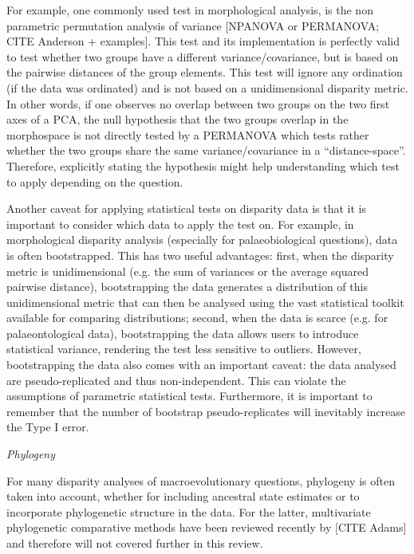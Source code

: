 \documentclass[12pt,letterpaper]{article}
\renewcommand{\subsection}[1]{%
\bigskip
\begin{center}
\begin{large}
\normalfont\itshape #1
\end{large}
\end{center}}
\begin{document}
For example, one commonly used test in morphological analysis, is the non parametric permutation analysis of variance [NPANOVA or PERMANOVA; CITE Anderson + examples].
This test and its implementation is perfectly valid to test whether two groups have a different variance/covariance, but is based on the pairwise distances of the group elements.
This test will ignore any ordination (if the data was ordinated) and is not based on a unidimensional disparity metric.
In other words, if one observes no overlap between two groups on the two first axes of a PCA, the null hypothesis that the two groups overlap in the morphospace is not directly tested by a PERMANOVA which tests rather whether the two groups share the same variance/covariance in a ``distance-space''.
Therefore, explicitly stating the hypothesis might help understanding which test to apply depending on the question.

Another caveat for applying statistical tests on disparity data is that it is important to consider which data to apply the test on.
For example, in morphological disparity analysis (especially for palaeobiological questions), data is often bootstrapped.
This has two useful advantages: first, when the disparity metric is unidimensional (e.g. the sum of variances or the average squared pairwise distance), bootstrapping the data generates a distribution of this unidimensional metric that can then be analysed using the vast statistical toolkit available for comparing distributions; second, when the data is scarce (e.g. for palaeontological data), bootstrapping the data allows users to introduce statistical variance, rendering the test less sensitive to outliers.
However, bootstrapping the data also comes with an important caveat: the data analysed are pseudo-replicated and thus non-independent.
This can violate the assumptions of parametric statistical tests.
Furthermore, it is important to remember that the number of bootstrap pseudo-replicates will inevitably increase the Type I error.


\subsection{Phylogeny}
For many disparity analyses of macroevolutionary questions, phylogeny is often taken into account, whether for including ancestral state estimates or to incorporate phylogenetic structure in the data.
For the latter, multivariate phylogenetic comparative methods have been reviewed recently by [CITE Adams] %
and therefore will not covered further in this review.
\end{document}
